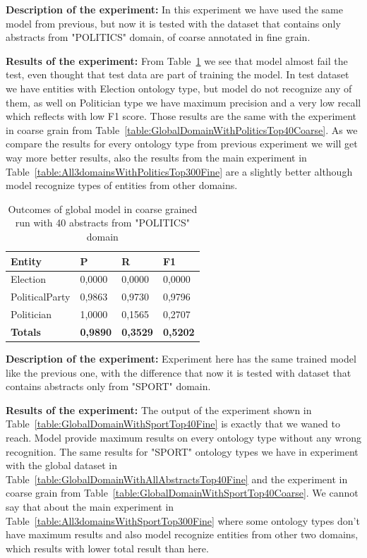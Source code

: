 \documentclass[thesis=M,english]{FITthesis}[2018/05/30]
\begin{document}
	\textbf{Description of the experiment:} In this experiment we have used the same model from previous, but now it is tested with the dataset that contains only abstracts from "POLITICS" domain, of coarse annotated in fine grain.

	\textbf{Results of the experiment:} From Table~\ref{table:GlobalDomainWithPoliticsTop40Fine} we see that model almost fail the test, even thought that test data are part of training the model. In test dataset we have entities with Election ontology type, but model do not recognize any of them, as well on Politician type we have maximum precision and a very low recall which reflects with low F1 score. Those results are the same with the experiment in coarse grain from Table~\ref{table:GlobalDomainWithPoliticsTop40Coarse}. As we compare the results for every ontology type from previous experiment we will get way more better results, also the results from the main experiment in Table~\ref{table:All3domainsWithPoliticsTop300Fine} are a slightly better although model recognize types of entities from other domains.    

	\begin{table}[H]\centering
		\begin{tabular}{|l|l|l|l|}
			\hline {\textbf{Entity}} & {\textbf{P}} & {\textbf{R}} & {\textbf{F1}}\\\hline
				Election & 0,0000 & 0,0000 & 0,0000\\
				PoliticalParty & 0,9863 & 0,9730 & 0,9796\\
				Politician & 1,0000 & 0,1565 & 0,2707\\\hline
				\textbf{Totals} & \textbf{0,9890} & \textbf{0,3529} & \textbf{0,5202}\\\hline
		\end{tabular}
		\caption{Outcomes of global model in coarse grained run with 40 abstracts from "POLITICS" domain \label{table:GlobalDomainWithPoliticsTop40Fine}}
	\end{table}	


	\textbf{Description of the experiment:} Experiment here has the same trained model like the previous one, with the difference that now it is tested with dataset that contains abstracts only from "SPORT" domain.

	\textbf{Results of the experiment:} The output of the experiment shown in Table~\ref{table:GlobalDomainWithSportTop40Fine} is exactly that we waned to reach. Model provide maximum results on every ontology type without any wrong recognition. The same results for "SPORT" ontology types we have in experiment with the global dataset in Table~\ref{table:GlobalDomainWithAllAbstractsTop40Fine} and the experiment in coarse grain from Table~\ref{table:GlobalDomainWithSportTop40Coarse}. We cannot say that about the main experiment in Table~\ref{table:All3domainsWithSportTop300Fine} where some ontology types don't have maximum results and also model recognize entities from other two domains, which results with lower total result than here.
\end{document}
